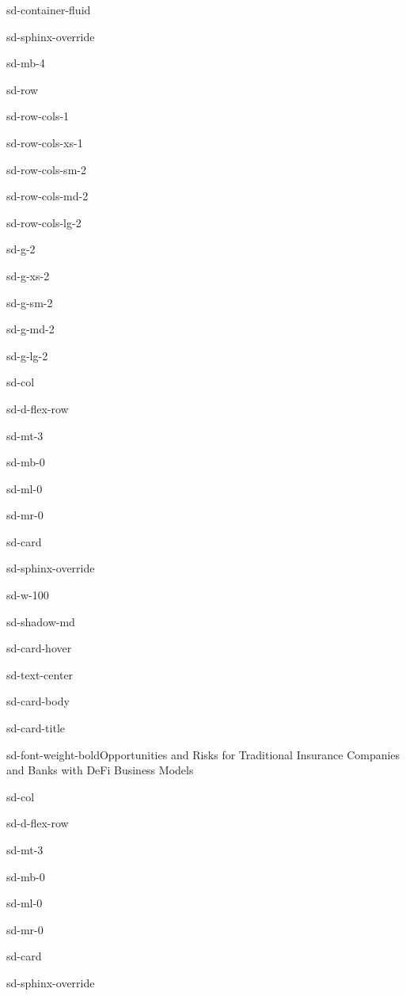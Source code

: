 \documentclass[letterpaper,10pt,english]{jupyterBook}
\begin{document}
\begin{sphinxuseclass}{sd-container-fluid}
\begin{sphinxuseclass}{sd-sphinx-override}
\begin{sphinxuseclass}{sd-mb-4}
\begin{sphinxuseclass}{sd-row}
\begin{sphinxuseclass}{sd-row-cols-1}
\begin{sphinxuseclass}{sd-row-cols-xs-1}
\begin{sphinxuseclass}{sd-row-cols-sm-2}
\begin{sphinxuseclass}{sd-row-cols-md-2}
\begin{sphinxuseclass}{sd-row-cols-lg-2}
\begin{sphinxuseclass}{sd-g-2}
\begin{sphinxuseclass}{sd-g-xs-2}
\begin{sphinxuseclass}{sd-g-sm-2}
\begin{sphinxuseclass}{sd-g-md-2}
\begin{sphinxuseclass}{sd-g-lg-2}
\begin{sphinxuseclass}{sd-col}
\begin{sphinxuseclass}{sd-d-flex-row}
\begin{sphinxuseclass}{sd-mt-3}
\begin{sphinxuseclass}{sd-mb-0}
\begin{sphinxuseclass}{sd-ml-0}
\begin{sphinxuseclass}{sd-mr-0}
\begin{sphinxuseclass}{sd-card}
\begin{sphinxuseclass}{sd-sphinx-override}
\begin{sphinxuseclass}{sd-w-100}
\begin{sphinxuseclass}{sd-shadow-md}
\begin{sphinxuseclass}{sd-card-hover}
\begin{sphinxuseclass}{sd-text-center}
\begin{sphinxuseclass}{sd-card-body}
\begin{sphinxuseclass}{sd-card-title}
\begin{sphinxuseclass}{sd-font-weight-bold}Opportunities and Risks for Traditional Insurance Companies and Banks with DeFi Business Models
\end{sphinxuseclass}
\end{sphinxuseclass}




\end{sphinxuseclass}
\end{sphinxuseclass}
\end{sphinxuseclass}
\end{sphinxuseclass}
\end{sphinxuseclass}
\end{sphinxuseclass}
\end{sphinxuseclass}
\end{sphinxuseclass}
\end{sphinxuseclass}
\end{sphinxuseclass}
\end{sphinxuseclass}
\end{sphinxuseclass}
\end{sphinxuseclass}
\begin{sphinxuseclass}{sd-col}
\begin{sphinxuseclass}{sd-d-flex-row}
\begin{sphinxuseclass}{sd-mt-3}
\begin{sphinxuseclass}{sd-mb-0}
\begin{sphinxuseclass}{sd-ml-0}
\begin{sphinxuseclass}{sd-mr-0}
\begin{sphinxuseclass}{sd-card}
\begin{sphinxuseclass}{sd-sphinx-override}

\end{sphinxuseclass}
\end{sphinxuseclass}
\end{sphinxuseclass}
\end{sphinxuseclass}
\end{sphinxuseclass}
\end{sphinxuseclass}
\end{sphinxuseclass}
\end{sphinxuseclass}
\end{sphinxuseclass}
\end{sphinxuseclass}
\end{sphinxuseclass}
\end{sphinxuseclass}
\end{sphinxuseclass}
\end{sphinxuseclass}
\end{sphinxuseclass}
\end{sphinxuseclass}
\end{sphinxuseclass}
\end{sphinxuseclass}
\end{sphinxuseclass}
\end{sphinxuseclass}
\end{sphinxuseclass}
\end{sphinxuseclass}
\end{document}
